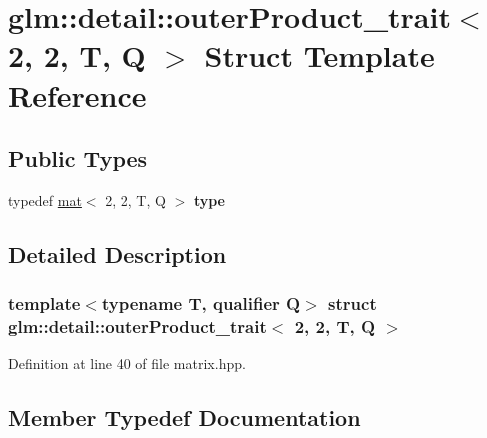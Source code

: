 \hypertarget{structglm_1_1detail_1_1outerProduct__trait_3_012_00_012_00_01T_00_01Q_01_4}{}\section{glm\+:\+:detail\+:\+:outer\+Product\+\_\+trait$<$ 2, 2, T, Q $>$ Struct Template Reference}
\label{structglm_1_1detail_1_1outerProduct__trait_3_012_00_012_00_01T_00_01Q_01_4}
\subsection*{Public Types}
\begin{DoxyCompactItemize}
\item 
\mbox{\label{structglm_1_1detail_1_1outerProduct__trait_3_012_00_012_00_01T_00_01Q_01_4_a28a25a20b2ff9729f6fb60728dc8a305}} 
typedef \hyperlink{structglm_1_1mat}{mat}$<$ 2, 2, T, Q $>$ {\bfseries type}
\end{DoxyCompactItemize}


\subsection{Detailed Description}
\subsubsection*{template$<$typename T, qualifier Q$>$\newline
struct glm\+::detail\+::outer\+Product\+\_\+trait$<$ 2, 2, T, Q $>$}



Definition at line 40 of file matrix.\+hpp.



\subsection{Member Typedef Documentation}
\mbox{\label{structglm_1_1detail_1_1outerProduct__trait_3_012_00_012_00_01T_00_01Q_01_4_a28a25a20b2ff9729f6fb60728dc8a305}} 
